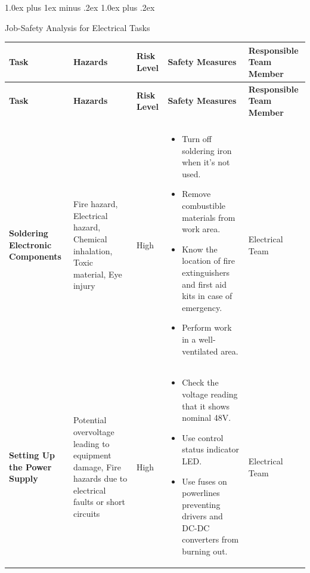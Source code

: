 \documentclass[conference, 12pt]{IEEEtran}
\makeatletter
\def\section{\@startsection {section}{1}{\z@}%
    {1.0ex plus 1ex minus .2ex}%
    {1.0ex plus .2ex}%
    {\normalfont\normalsize\bfseries\raggedright}}
\makeatother
\begin{document}
\section{Job-Safety Analysis for Electrical Tasks}
\begin{longtable}{|>{\raggedright}p{3.5cm}|>{\raggedright}p{3.5cm}|p{1.5cm}|>{\raggedright}p{5cm}|p{3cm}|}
    \hline
    \rowcolor{gray!20} \textbf{Task} & \textbf{Hazards} & \textbf{Risk Level} & \textbf{Safety Measures} & \textbf{Responsible Team Member} \\
    \hline
    \endfirsthead
    \hline
    \rowcolor{gray!20} \textbf{Task} & \textbf{Hazards} & \textbf{Risk Level} & \textbf{Safety Measures} & \textbf{Responsible Team Member} \\
    \hline
    \endhead
    \hline
    \multicolumn{5}{r}{\textbf{(Continued on next page)}} \\
    \endfoot
    \endlastfoot
    \textbf{Soldering Electronic Components}
        & Fire hazard, Electrical hazard, Chemical inhalation, Toxic material, Eye injury
        & High
        & \vspace{-0.8\baselineskip}\begin{itemize}[leftmargin=*]
            \item Turn off soldering iron when it’s not used.
            \item Remove combustible materials from work area.
            \item Know the location of fire extinguishers and first aid kits in case of emergency.
            \item Perform work in a well-ventilated area.
        \end{itemize}
        & Electrical Team \\
    \hline
    \textbf{Setting Up the Power Supply}
        & Potential overvoltage leading to equipment damage, Fire hazards due to electrical faults or short circuits
        & High
        & \vspace{-0.8\baselineskip}\begin{itemize}[leftmargin=*]
            \item Check the voltage reading that it shows nominal 48V.
            \item Use control status indicator LED.
            \item Use fuses on powerlines preventing drivers and DC-DC converters from burning out.
        \end{itemize}
        & Electrical Team \\

\end{longtable}
\end{document}
